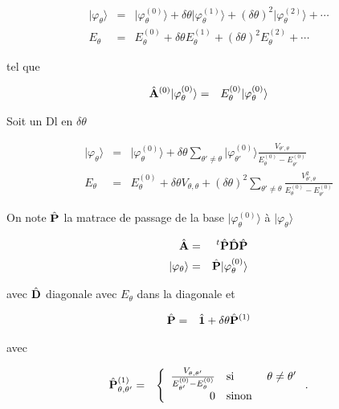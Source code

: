 \begin{eqnarray*}
	\vert \varphi_\theta \rangle  & = & \vert \varphi_\theta^{(0)} \rangle  + \delta \theta  \vert \varphi_\theta^{(1)}	\rangle  + 	(\delta \theta)^2 \vert \varphi_\theta^{(2)}	\rangle  + \cdots \\
	E_\theta & = & E_\theta^{(0)}   + \delta \theta E_\theta^{(1)}  + 	(\delta \theta)^2 E_\theta^{(2)} + \cdots 	
\end{eqnarray*}

tel que 

\begin{eqnarray*}
	\hat{\mathbf{A}}^{(0)} \vert \varphi_\theta^{(0)} \rangle & = & E_\theta^{(0)}	 \vert \varphi_\theta^{(0)} \rangle 	
\end{eqnarray*}

Soit un Dl en $\delta \theta $ 

\begin{eqnarray*}
	\vert \varphi_\theta \rangle & = & \vert \varphi_\theta^{(0)} \rangle + \delta \theta \sum_{\theta' \neq \theta } \vert \varphi_{\theta'}^{(0)} \rangle   \frac{ V_{\theta', \theta}}{ E_\theta^{(0)} - E_{\theta'}^{(0)} } \\
	E_\theta & = & E_\theta^{(0)} + \delta \theta V_{\theta , \theta} + (\delta \theta)^2 \sum_{\theta' \neq \theta } \frac{ V_{\theta', \theta}^2}{ E_\theta^{(0)} - E_{\theta'}^{(0)} }
\end{eqnarray*}

On note $\hat{\mathbf{P}}$ la matrace de passage de la base $\vert \varphi_\theta^{(0)} \rangle $ à $\vert \varphi_\theta \rangle $


\begin{eqnarray*}
	\hat{\mathbf{A}} & = & {~}^t\hat{\mathbf{P}}\hat{\mathbf{D}}\hat{\mathbf{P}}	\\
	\vert \varphi_\theta \rangle & = & 	\hat{\mathbf{P}}\vert \varphi_\theta^{(0)} \rangle
\end{eqnarray*}

avec $\hat{\mathbf{D}}$ diagonale avec $E_\theta$ dans la diagonale et 

\begin{eqnarray*}
	\hat{\mathbf{P}} & = & 	\hat{\mathbf{1}}	 + \delta \theta \hat{\mathbf{P}}^{(1)}
\end{eqnarray*}

avec 

\begin{eqnarray*}
	 \operator{P}^{(1)}_{\theta,\theta'} & = & \left \{ \begin{array}{rll} \frac{ V_{\theta,\theta'}}{ E_{\theta'}^{(0)} - E_{\theta}^{(0)} } & \mbox{si} & \theta \neq \theta' \\ 0 & \mbox{sinon}    \end{array}\right.	.	
\end{eqnarray*}

